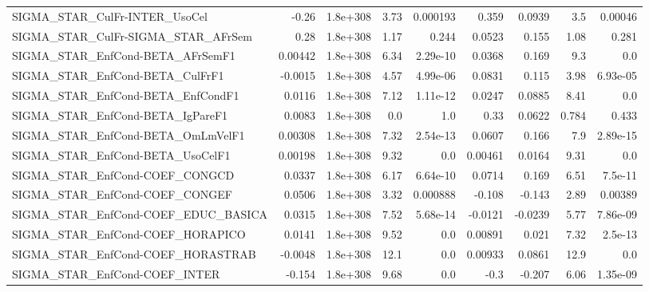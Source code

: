 \begin{tabular}{lrrrrrrrr}
SIGMA\_STAR\_CulFr-INTER\_UsoCel         &       -0.26 &     1.8e+308 &     3.73 & 0.000193 &      0.359 &      0.0939 &          3.5 &       0.00046 \\
SIGMA\_STAR\_CulFr-SIGMA\_STAR\_AFrSem    &        0.28 &     1.8e+308 &     1.17 &    0.244 &     0.0523 &       0.155 &         1.08 &         0.281 \\
SIGMA\_STAR\_EnfCond-BETA\_AFrSemF1      &     0.00442 &     1.8e+308 &     6.34 & 2.29e-10 &     0.0368 &       0.169 &          9.3 &           0.0 \\
SIGMA\_STAR\_EnfCond-BETA\_CulFrF1       &     -0.0015 &     1.8e+308 &     4.57 & 4.99e-06 &     0.0831 &       0.115 &         3.98 &      6.93e-05 \\
SIGMA\_STAR\_EnfCond-BETA\_EnfCondF1     &      0.0116 &     1.8e+308 &     7.12 & 1.11e-12 &     0.0247 &      0.0885 &         8.41 &           0.0 \\
SIGMA\_STAR\_EnfCond-BETA\_IgPareF1      &      0.0083 &     1.8e+308 &      0.0 &      1.0 &       0.33 &      0.0622 &        0.784 &         0.433 \\
SIGMA\_STAR\_EnfCond-BETA\_OmLmVelF1     &     0.00308 &     1.8e+308 &     7.32 & 2.54e-13 &     0.0607 &       0.166 &          7.9 &      2.89e-15 \\
SIGMA\_STAR\_EnfCond-BETA\_UsoCelF1      &     0.00198 &     1.8e+308 &     9.32 &      0.0 &    0.00461 &      0.0164 &         9.31 &           0.0 \\
SIGMA\_STAR\_EnfCond-COEF\_CONGCD        &      0.0337 &     1.8e+308 &     6.17 & 6.64e-10 &     0.0714 &       0.169 &         6.51 &       7.5e-11 \\
SIGMA\_STAR\_EnfCond-COEF\_CONGEF        &      0.0506 &     1.8e+308 &     3.32 & 0.000888 &     -0.108 &      -0.143 &         2.89 &       0.00389 \\
SIGMA\_STAR\_EnfCond-COEF\_EDUC\_BASICA   &      0.0315 &     1.8e+308 &     7.52 & 5.68e-14 &    -0.0121 &     -0.0239 &         5.77 &      7.86e-09 \\
SIGMA\_STAR\_EnfCond-COEF\_HORAPICO      &      0.0141 &     1.8e+308 &     9.52 &      0.0 &    0.00891 &       0.021 &         7.32 &       2.5e-13 \\
SIGMA\_STAR\_EnfCond-COEF\_HORASTRAB     &     -0.0048 &     1.8e+308 &     12.1 &      0.0 &    0.00933 &      0.0861 &         12.9 &           0.0 \\
SIGMA\_STAR\_EnfCond-COEF\_INTER         &      -0.154 &     1.8e+308 &     9.68 &      0.0 &       -0.3 &      -0.207 &         6.06 &      1.35e-09 \\

\end{tabular}
